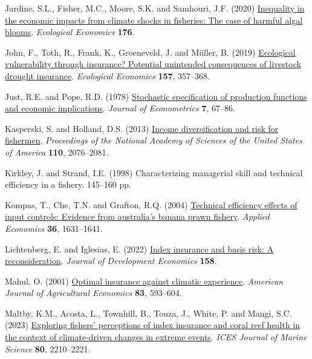 \documentclass[
  letterpaper,
  DIV=11,
  numbers=noendperiod]{scrartcl}
\newlength{\cslhangindent}
\newenvironment{CSLReferences}[2] %
 {\begin{list}{}{%
  \setlength{\itemindent}{0pt}
  \setlength{\leftmargin}{0pt}
  \setlength{\parsep}{0pt}
  \ifodd #1
   \setlength{\leftmargin}{\cslhangindent}
   \setlength{\itemindent}{-1\cslhangindent}
  \fi
  \setlength{\itemsep}{#2\baselineskip}}}
 {\end{list}}
\theoremstyle{plain}
\theoremstyle{plain}
\theoremstyle{remark}
\begin{document}
\begin{CSLReferences}{1}{0}
Jardine, S.L., Fisher, M.C., Moore, S.K. and Samhouri, J.F. (2020)
\href{https://doi.org/10.1016/j.ecolecon.2020.106691}{Inequality in the
economic impacts from climate shocks in fisheries: The case of harmful
algal blooms}. \emph{Ecological Economics} \textbf{176}.

John, F., Toth, R., Frank, K., Groeneveld, J. and Müller, B. (2019)
\href{https://doi.org/10.1016/J.ECOLECON.2018.11.021}{Ecological
vulnerability through insurance? Potential unintended consequences of
livestock drought insurance}. \emph{Ecological Economics} \textbf{157},
357--368.

Just, R.E. and Pope, R.D. (1978)
\href{https://doi.org/10.1016/0304-4076(78)90006-4}{Stochastic
specification of production functions and economic implications}.
\emph{Journal of Econometrics} \textbf{7}, 67--86.

Kasperski, S. and Holland, D.S. (2013)
\href{https://doi.org/10.1073/pnas.1212278110}{Income diversification
and risk for fishermen}. \emph{Proceedings of the National Academy of
Sciences of the United States of America} \textbf{110}, 2076--2081.

Kirkley, J. and Strand, I.E. (1998) Characterizing managerial skill and
technical efficiency in a fishery. 145--160 pp.

Kompas, T., Che, T.N. and Grafton, R.Q. (2004)
\href{https://doi.org/10.1080/0003684042000218561}{Technical efficiency
effects of input controls: Evidence from australia's banana prawn
fishery}. \emph{Applied Economics} \textbf{36}, 1631--1641.

Lichtenberg, E. and Iglesias, E. (2022)
\href{https://doi.org/10.1016/j.jdeveco.2022.102883}{Index insurance and
basis risk: A reconsideration}. \emph{Journal of Development Economics}
\textbf{158}.

Mahul, O. (2001) \href{https://doi.org/10.1111/0002-9092.00180}{Optimal
insurance against climatic experience}. \emph{American Journal of
Agricultural Economics} \textbf{83}, 593--604.

Maltby, K.M., Acosta, L., Townhill, B., Touza, J., White, P. and Mangi,
S.C. (2023) \href{https://doi.org/10.1093/icesjms/fsac003}{Exploring
fishers' perceptions of index insurance and coral reef health in the
context of climate-driven changes in extreme events}. \emph{ICES Journal
of Marine Science} \textbf{80}, 2210--2221.


\end{CSLReferences}
\end{document}
